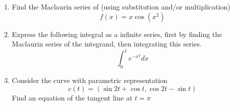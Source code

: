 \begin{enumerate}
\newpage %

  \item Find the Maclaurin series of (using substitution and/or multiplication)
    \[f(x) = x \cos (x^2)\]

\newpage %

  \item Express the following integral as a infinite series, first by finding the
    Maclaurin series of the integrand, then integrating this series.
    \[%
    \int_{0}^{1} e^{-x^2}  dx
    \]%

\newpage %

  \item Consider the curve with parametric representation \[c(t) = (\sin 2t +
    \cos t, \cos 2t - \sin t)\]
    Find an equation of the tangent line at \(t=\pi\)

\end{enumerate}
